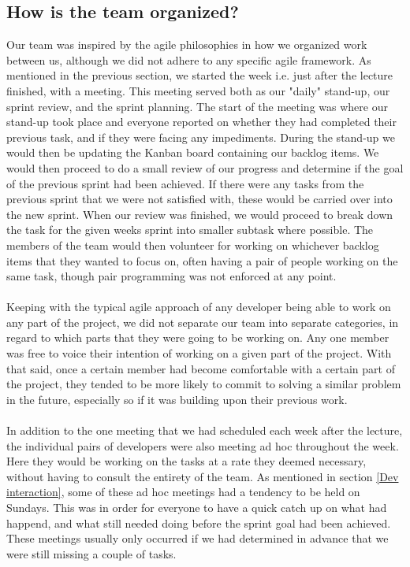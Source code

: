\subsection{How is the team organized?} \label{Team organization}
Our team was inspired by the agile philosophies in how we organized work between us, although we did not adhere to any specific agile framework. As mentioned in the previous section, we started the week i.e. just after the lecture finished, with a meeting. This meeting served both as our "daily" stand-up, our sprint review, and the sprint planning. The start of the meeting was where our stand-up took place and everyone reported on whether they had completed their previous task, and if they were facing any impediments. During the stand-up we would then be updating the Kanban board containing our backlog items. We would then proceed to do a small review of our progress and determine if the goal of the previous sprint had been achieved. If there were any tasks from the previous sprint that we were not satisfied with, these would be carried over into the new sprint. When our review was finished, we would proceed to break down the task for the given weeks sprint into smaller subtask where possible. The members of the team would then volunteer for working on whichever backlog items that they wanted to focus on, often having a pair of people working on the same task, though pair programming was not enforced at any point.
\\\\
Keeping with the typical agile approach of any developer being able to work on any part of the project, we did not separate our team into separate categories, in regard to which parts that they were going to be working on. Any one member was free to voice their intention of working on a given part of the project. With that said, once a certain member had become comfortable  with a certain part of the project, they tended to be more likely to commit to solving a similar problem in the future, especially so if it was building upon their previous work.
\\\\
In addition to the one meeting that we had scheduled each week after the lecture, the individual pairs of developers were also meeting ad hoc throughout the week. Here they would be working on the tasks at a rate they deemed necessary, without having to consult the entirety of the team. As mentioned in section \ref{Dev interaction}, some of these ad hoc meetings had a tendency to be held on Sundays. This was in order for everyone to have a quick catch up on what had happend, and what still needed doing before the sprint goal had been achieved. These meetings usually only occurred if we had determined in advance that we were still missing a couple of tasks.

